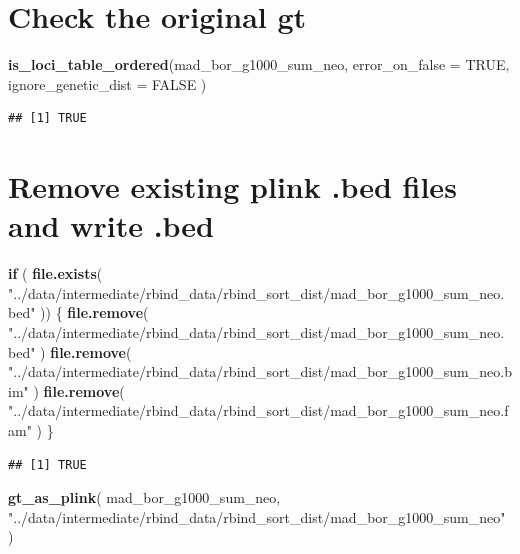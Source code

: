 \documentclass[
]{article}
\newenvironment{Shaded}{\begin{snugshade}}{\end{snugshade}}
\newcommand{\AttributeTok}[1]{\textcolor[rgb]{0.13,0.29,0.53}{#1}}
\newcommand{\ConstantTok}[1]{\textcolor[rgb]{0.56,0.35,0.01}{#1}}
\newcommand{\ControlFlowTok}[1]{\textcolor[rgb]{0.13,0.29,0.53}{\textbf{#1}}}
\newcommand{\FunctionTok}[1]{\textcolor[rgb]{0.13,0.29,0.53}{\textbf{#1}}}
\newcommand{\NormalTok}[1]{#1}
\newcommand{\StringTok}[1]{\textcolor[rgb]{0.31,0.60,0.02}{#1}}
\begin{document}
\section{Check the original gt}\label{check-the-original-gt}

\begin{Shaded}
\begin{Highlighting}[]
\FunctionTok{is\_loci\_table\_ordered}\NormalTok{(mad\_bor\_g1000\_sum\_neo,}
  \AttributeTok{error\_on\_false =} \ConstantTok{TRUE}\NormalTok{,}
  \AttributeTok{ignore\_genetic\_dist =} \ConstantTok{FALSE}
\NormalTok{)}
\end{Highlighting}
\end{Shaded}

\begin{verbatim}
## [1] TRUE
\end{verbatim}

\section{Remove existing plink .bed files and write
.bed}\label{remove-existing-plink-.bed-files-and-write-.bed}

\begin{Shaded}
\begin{Highlighting}[]
\ControlFlowTok{if}\NormalTok{ (}
  \FunctionTok{file.exists}\NormalTok{(}
    \StringTok{"../data/intermediate/rbind\_data/rbind\_sort\_dist/mad\_bor\_g1000\_sum\_neo.bed"}
\NormalTok{  )) \{}
  \FunctionTok{file.remove}\NormalTok{(}
    \StringTok{"../data/intermediate/rbind\_data/rbind\_sort\_dist/mad\_bor\_g1000\_sum\_neo.bed"}
\NormalTok{  )}
  \FunctionTok{file.remove}\NormalTok{(}
    \StringTok{"../data/intermediate/rbind\_data/rbind\_sort\_dist/mad\_bor\_g1000\_sum\_neo.bim"}
\NormalTok{  )}
  \FunctionTok{file.remove}\NormalTok{(}
    \StringTok{"../data/intermediate/rbind\_data/rbind\_sort\_dist/mad\_bor\_g1000\_sum\_neo.fam"}
\NormalTok{  )}
\NormalTok{\}}
\end{Highlighting}
\end{Shaded}

\begin{verbatim}
## [1] TRUE
\end{verbatim}

\begin{Shaded}
\begin{Highlighting}[]
\FunctionTok{gt\_as\_plink}\NormalTok{(}
\NormalTok{  mad\_bor\_g1000\_sum\_neo,}
  \StringTok{"../data/intermediate/rbind\_data/rbind\_sort\_dist/mad\_bor\_g1000\_sum\_neo"}
\NormalTok{)}
\end{Highlighting}
\end{Shaded}
\end{document}

